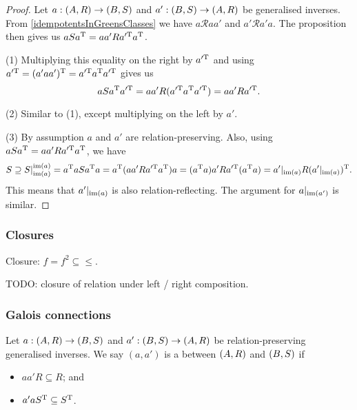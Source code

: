 \begin{proof}
Let $a: \left( A,R \right) \to \left( B,S \right)$ and $a': \left( B,S \right) \to \left( A,R \right)$ be generalised inverses. From \ref{idempotentsInGreensClasses} we have $a\mathcal{R}aa'$ and $a'\mathcal{R}a'a$. The proposition then gives us $aSa^{\mathrm{T}} = aa'Ra^{\prime\mathrm{T}} a^{\mathrm{T}}$.

(1) Multiplying this equality on the right by $a^{\prime\mathrm{T}}$ and using $a^{\prime\mathrm{T}} = (a'aa')^{\mathrm{T}} = a^{\prime\mathrm{T}} a^{\mathrm{T}} a^{\prime\mathrm{T}}$ gives us
\[ aSa^{\mathrm{T}} a^{\prime\mathrm{T}} = aa'R(a^{\prime\mathrm{T}} a^{\mathrm{T}} a^{\prime\mathrm{T}}) = aa'Ra^{\prime\mathrm{T}}. \]

(2) Similar to (1), except multiplying on the left by $a'$.

(3) By assumption $a$ and $a'$ are relation-preserving. Also, using $aSa^{\mathrm{T}} = aa'Ra^{\prime\mathrm{T}} a^{\mathrm{T}}$, we have
\[ S \supseteq S|_{\operatorname{im}(a)}^{\operatorname{im}(a)} = a^{\mathrm{T}} aSa^{\mathrm{T}} a = a^{\mathrm{T}} (aa'Ra^{\prime\mathrm{T}} a^{\mathrm{T}}) a = (a^{\mathrm{T}} a)a'Ra^{\prime\mathrm{T}} (a^{\mathrm{T}} a) = a'|_{\operatorname{im}(a)}R(a'|_{\operatorname{im}(a)})^{\mathrm{T}}. \]
This means that $a'|_{\operatorname{im}(a)}$ is also relation-reflecting. The argument for $a|_{\operatorname{im}(a')}$ is similar.
\end{proof}

\subsubsection{Closures}
Closure: $f= f^2 \subseteq \leq$.

TODO: closure of relation under left / right composition.

\subsubsection{Galois connections}
\begin{definition}
Let $a: \left( A,R \right) \to \left( B,S \right)$ and $a': \left( B,S \right) \to \left( A,R \right)$ be relation-preserving generalised inverses. We say $(a,a')$ is a  between $\left( A, R \right)$ and $\left( B, S \right)$ if
\begin{itemize}
\item $aa'R \subseteq R$; and
\item $a'aS^{\mathrm{T}} \subseteq S^{\mathrm{T}}$.
\end{itemize}
\end{definition}


